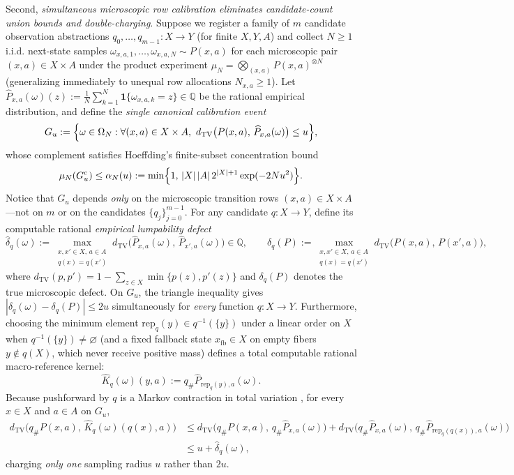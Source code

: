 \documentclass[11pt,a4paper]{article}
\begin{document}
Second, \emph{simultaneous microscopic row calibration eliminates
candidate-count union bounds and double-charging}. Suppose we register a
family of \(m\) candidate observation abstractions
\(q_0, \dots, q_{m-1}: X \to Y\) (for finite \(X, Y, A\)) and collect
\(N \ge 1\) i.i.d. next-state samples
\(\omega_{x,a,1}, \dots, \omega_{x,a,N} \sim P(x,a)\) for each
microscopic pair \((x,a) \in X \times A\) under the product experiment
\(\mu_N = \bigotimes_{(x,a)} P(x,a)^{\otimes N}\) (generalizing
immediately to unequal row allocations \(N_{x,a} \ge 1\)). Let
\(\widehat{P}_{x,a}(\omega)(z) := \frac{1}{N}\sum_{k=1}^N \mathbf{1}\{\omega_{x,a,k} = z\} \in \mathbb{Q}\)
be the rational empirical distribution, and define the \emph{single
canonical calibration event}
\[G_u := \Bigl\{\omega \in \Omega_N : \forall (x,a) \in X \times A,\ d_{\mathrm{TV}}\bigl(P(x,a),\, \widehat{P}_{x,a}(\omega)\bigr) \le u\Bigr\},\]
whose complement satisfies Hoeffding's finite-subset concentration bound
\citep{hoeffding1963}
\[\mu_N(G_u^c) \le \alpha_N(u) := \min\Bigl\{1,\, |X|\,|A|\, 2^{|X|+1} \exp(-2 N u^2)\Bigr\}.\]
Notice that \(G_u\) depends \emph{only} on the microscopic transition
rows \((x,a) \in X \times A\)---not on \(m\) or on the candidates
\(\{q_j\}_{j=0}^{m-1}\). For any candidate \(q: X \to Y\), define its
computable rational \emph{empirical lumpability defect}
\citep{burkeRosenblatt1958, ferns2004, ravindranBarto2004}
\[\widehat{\delta}_q(\omega) := \max_{\substack{x, x' \in X,\, a \in A \\ q(x) = q(x')}} d_{\mathrm{TV}}\bigl(\widehat{P}_{x,a}(\omega),\, \widehat{P}_{x',a}(\omega)\bigr) \in \mathbb{Q},
\qquad
\delta_q(P) := \max_{\substack{x, x' \in X,\, a \in A \\ q(x) = q(x')}} d_{\mathrm{TV}}\bigl(P(x,a),\, P(x',a)\bigr),\]
where
\(d_{\mathrm{TV}}(p, p') = 1 - \sum_{z \in X} \min\{p(z), p'(z)\}\) and
\(\delta_q(P)\) denotes the true microscopic defect. On \(G_u\), the
triangle inequality gives
\(|\widehat{\delta}_q(\omega) - \delta_q(P)| \le 2u\) simultaneously for
\emph{every} function \(q: X \to Y\). Furthermore, choosing the minimum
element \(\mathrm{rep}_q(y) \in q^{-1}(\{y\})\) under a linear order on
\(X\) when \(q^{-1}(\{y\}) \neq \varnothing\) (and a fixed fallback
state \(x_{\mathrm{fb}} \in X\) on empty fibers \(y \notin q(X)\), which
never receive positive mass) defines a total computable rational
macro-reference kernel:
\[\widehat{K}_q(\omega)(y, a) := q_\# \widehat{P}_{\mathrm{rep}_q(y), a}(\omega).\]
Because pushforward by \(q\) is a Markov contraction in total variation
\citep{dobrushin1956, pinsker1964}, for every \(x \in X\) and
\(a \in A\) on \(G_u\), \[\begin{aligned}
d_{\mathrm{TV}}\bigl(q_\# P(x,a),\, \widehat{K}_q(\omega)(q(x), a)\bigr)
&\le d_{\mathrm{TV}}\bigl(q_\# P(x,a),\, q_\# \widehat{P}_{x,a}(\omega)\bigr)
   + d_{\mathrm{TV}}\bigl(q_\# \widehat{P}_{x,a}(\omega),\, q_\# \widehat{P}_{\mathrm{rep}_q(q(x)), a}(\omega)\bigr) \\
&\le u + \widehat{\delta}_q(\omega),
\end{aligned}\] charging \emph{only one} sampling radius \(u\) rather
than \(2u\).
\end{document}
